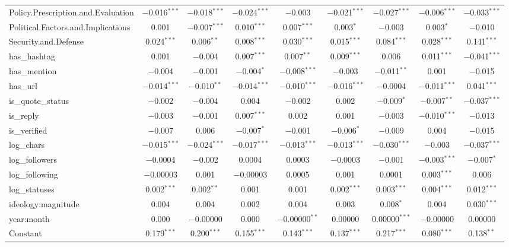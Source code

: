 \begin{table}[!htbp]
\begin{tabular}{@{\extracolsep{5pt}}lcccccccc}
  Policy.Prescription.and.Evaluation & $-$0.016$^{***}$ & $-$0.018$^{***}$ & $-$0.024$^{***}$ & $-$0.003 & $-$0.021$^{***}$ & $-$0.027$^{***}$ & $-$0.006$^{***}$ & $-$0.033$^{***}$ \\ 
  Political.Factors.and.Implications & 0.001 & $-$0.007$^{***}$ & 0.010$^{***}$ & 0.007$^{***}$ & 0.003$^{*}$ & $-$0.003 & 0.003$^{*}$ & $-$0.010 \\ 
  Security.and.Defense & 0.024$^{***}$ & 0.006$^{**}$ & 0.008$^{***}$ & 0.030$^{***}$ & 0.015$^{***}$ & 0.084$^{***}$ & 0.028$^{***}$ & 0.141$^{***}$ \\ 
  has\_hashtag & 0.001 & $-$0.004 & 0.007$^{***}$ & 0.007$^{**}$ & 0.009$^{***}$ & 0.006 & 0.011$^{***}$ & $-$0.041$^{***}$ \\ 
  has\_mention & $-$0.004 & $-$0.001 & $-$0.004$^{*}$ & $-$0.008$^{***}$ & $-$0.003 & $-$0.011$^{**}$ & 0.001 & $-$0.015 \\ 
  has\_url & $-$0.014$^{***}$ & $-$0.010$^{**}$ & $-$0.014$^{***}$ & $-$0.010$^{***}$ & $-$0.016$^{***}$ & $-$0.0004 & $-$0.011$^{***}$ & 0.041$^{***}$ \\ 
  is\_quote\_status & $-$0.002 & $-$0.004 & 0.004 & $-$0.002 & 0.002 & $-$0.009$^{*}$ & $-$0.007$^{**}$ & $-$0.037$^{***}$ \\ 
  is\_reply & $-$0.003 & $-$0.001 & 0.007$^{***}$ & 0.002 & 0.001 & $-$0.003 & $-$0.010$^{***}$ & $-$0.013 \\ 
  is\_verified & $-$0.007 & 0.006 & $-$0.007$^{*}$ & $-$0.001 & $-$0.006$^{*}$ & $-$0.009 & 0.004 & $-$0.015 \\ 
  log\_chars & $-$0.015$^{***}$ & $-$0.024$^{***}$ & $-$0.017$^{***}$ & $-$0.013$^{***}$ & $-$0.013$^{***}$ & $-$0.030$^{***}$ & $-$0.003 & $-$0.037$^{***}$ \\ 
  log\_followers & $-$0.0004 & $-$0.002 & 0.0004 & 0.0003 & $-$0.0003 & $-$0.001 & $-$0.003$^{***}$ & $-$0.007$^{*}$ \\ 
  log\_following & $-$0.00003 & 0.001 & $-$0.00003 & 0.0005 & 0.001 & 0.0001 & 0.003$^{***}$ & 0.006 \\ 
  log\_statuses & 0.002$^{***}$ & 0.002$^{**}$ & 0.001 & 0.001 & 0.002$^{***}$ & 0.003$^{***}$ & 0.004$^{***}$ & 0.012$^{***}$ \\ 
  ideology:magnitude & 0.004 & 0.004 & 0.002 & 0.004 & 0.003 & 0.008$^{*}$ & 0.004 & 0.030$^{***}$ \\ 
  year:month & 0.000 & $-$0.00000 & 0.000 & $-$0.00000$^{**}$ & 0.00000 & 0.00000$^{***}$ & $-$0.00000 & 0.00000 \\ 
  Constant & 0.179$^{***}$ & 0.200$^{***}$ & 0.155$^{***}$ & 0.143$^{***}$ & 0.137$^{***}$ & 0.217$^{***}$ & 0.080$^{***}$ & 0.138$^{**}$ \\ 

\end{tabular}
\end{table}
